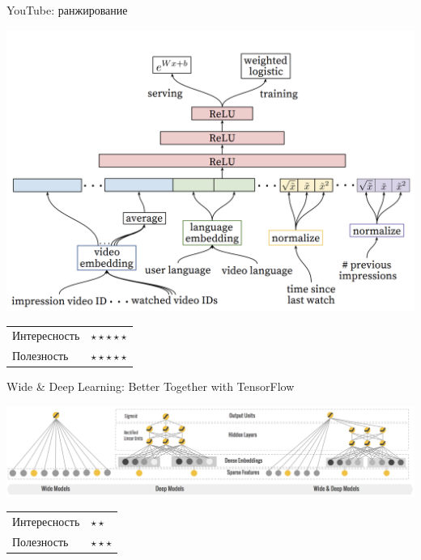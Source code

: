 \documentclass[11pt,aspectratio=169]{beamer}
\begin{document}
\begin{frame}{YouTube: ранжирование}

\begin{center}
\includegraphics[scale=0.3]{images/youtube-rank.png}
\end{center}

\begin{tabular}{l l}
Интересность & $\star\star\star\star\star$ \\
Полезность & $\star\star\star\star\star$
\end{tabular}

\end{frame}

\begin{frame}{Wide \& Deep Learning: Better Together with TensorFlow \cite{WD}}

\begin{center}
\includegraphics[scale=0.25]{images/widedeep.png}
\end{center}

\begin{tabular}{l l}
Интересность & $\star\star$ \\
Полезность & $\star\star\star$
\end{tabular}

\end{frame}
\end{document}
